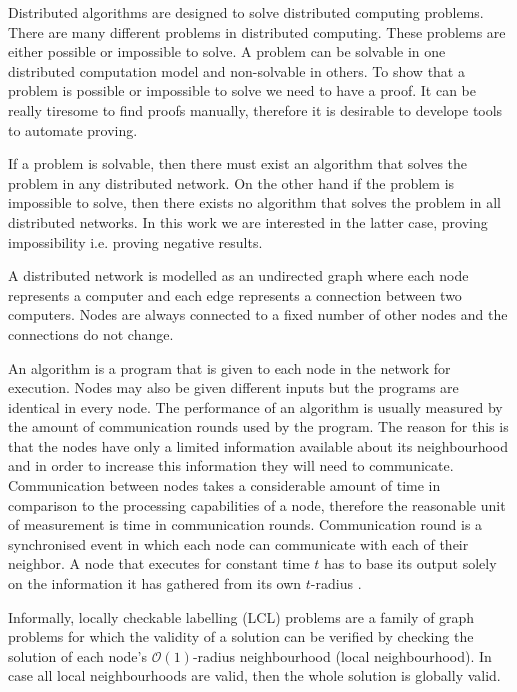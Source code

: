 Distributed algorithms are designed to solve distributed computing problems.
There are many different problems in distributed computing.
These problems are either possible or impossible to solve.
A problem can be solvable in one distributed computation model and non-solvable in others.
To show that a problem is possible or impossible to solve we need to have a proof.
It can be really tiresome to find proofs manually, therefore it is desirable to develope tools to automate proving.

If a problem is solvable, then there must exist an algorithm that solves the problem in any distributed network.
On the other hand if the problem is impossible to solve, then there exists no algorithm that solves the problem in all distributed networks.
In this work we are interested in the latter case, proving impossibility i.e. proving negative results.

A distributed network is modelled as an undirected graph where each node represents a computer and each edge represents a connection between two computers.
Nodes are always connected to a fixed number of other nodes and the connections do not change.
\cite{DBLP:journals/siamcomp/NaorS95}

An algorithm is a program that is given to each node in the network for execution.
Nodes may also be given different inputs but the programs are identical in every node.
The performance of an algorithm is usually measured by the amount of communication rounds used by the program.
The reason for this is that the nodes have only a limited information available about its neighbourhood and in order to increase this information they will need to communicate.
Communication between nodes takes a considerable amount of time in comparison to the processing capabilities of a node, therefore the reasonable unit of measurement is time in communication rounds.
Communication round is a synchronised event in which each node can communicate with each of their neighbor.
A node that executes for constant time $t$ has to base its output solely on the information it has gathered from its own $t$-radius
\cite{DBLP:journals/siamcomp/NaorS95}.

Informally, locally checkable labelling (LCL) problems are a family of graph problems for which the validity of a solution can be verified by checking the solution of each node's $\mathcal{O}(1)$-radius neighbourhood (local neighbourhood).
In case all local neighbourhoods are valid, then the whole solution is globally valid.
\cite{DBLP:conf/podc/BrandtHKLOPRSU17}


